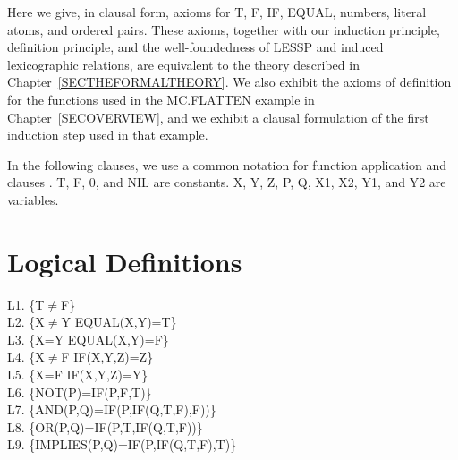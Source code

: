 \documentclass[10pt]{book}
\newenvironment{pubasis}{\begin{flushleft}}{\end{flushleft}}
\begin{document}
Here we give, in clausal form,  axioms for T, F, IF, EQUAL, numbers, literal
atoms, and ordered pairs.  These axioms, together with our induction principle,
definition principle, and the well-foundedness of LESSP and induced
lexicographic relations, are equivalent to the theory described
in Chapter~\ref{SECTHEFORMALTHEORY}.  We also exhibit the axioms of definition for
the functions used in the MC.FLATTEN example in Chapter~\ref{SECOVERVIEW},
and we exhibit a clausal formulation of the first induction step used in
that example.

In the following clauses, we use a common notation for function
application and clauses \cite{ROBINSON}.  T, F, 0, and NIL
are
constants.  X, Y, Z, P, Q, X1, X2, Y1, and Y2 are
variables.

\section{Logical Definitions}
\begin{pubasis}
L1.   \{T$\neq$F\}\\

L2.   \{X$\neq$Y EQUAL(X,Y)=T\}\\

L3.   \{X=Y EQUAL(X,Y)=F\}\\

L4.   \{X$\neq$F IF(X,Y,Z)=Z\}\\

L5.   \{X=F IF(X,Y,Z)=Y\}\\

L6.   \{NOT(P)=IF(P,F,T)\}\\

L7.   \{AND(P,Q)=IF(P,IF(Q,T,F),F))\}\\

L8.   \{OR(P,Q)=IF(P,T,IF(Q,T,F))\}\\

L9.   \{IMPLIES(P,Q)=IF(P,IF(Q,T,F),T)\}\\
\end{pubasis}
\end{document}
